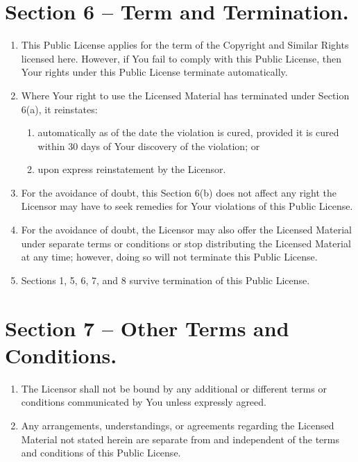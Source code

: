 \documentclass[a4paper, 12pt]{article}
\begin{document}
\section*{Section 6 – Term and Termination.}

\begin{enumerate}[label=\alph*.]
\item This Public License applies for the term of the Copyright and Similar Rights licensed here. However, if You fail to comply with this Public License, then Your rights under this Public License terminate automatically.
\item Where Your right to use the Licensed Material has terminated under Section 6(a), it reinstates:
\begin{enumerate}[label=\arabic*.]
\item automatically as of the date the violation is cured, provided it is cured within 30 days of Your discovery of the violation; or
\item upon express reinstatement by the Licensor.
\end{enumerate}
\item For the avoidance of doubt, this Section 6(b) does not affect any right the Licensor may have to seek remedies for Your violations of this Public License.
\item For the avoidance of doubt, the Licensor may also offer the Licensed Material under separate terms or conditions or stop distributing the Licensed Material at any time; however, doing so will not terminate this Public License.
\item Sections 1, 5, 6, 7, and 8 survive termination of this Public License.
\end{enumerate}

\section*{Section 7 – Other Terms and Conditions.}

\begin{enumerate}[label=\alph*.]
\item The Licensor shall not be bound by any additional or different terms or conditions communicated by You unless expressly agreed.
\item Any arrangements, understandings, or agreements regarding the Licensed Material not stated herein are separate from and independent of the terms and conditions of this Public License.
\end{enumerate}
\end{document}
